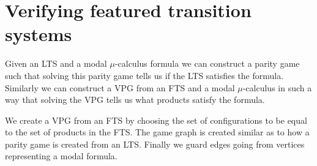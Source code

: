 \section{Verifying featured transition systems}
Given an LTS and a modal $\mu$-calculus formula we can construct a parity game such that solving this parity game tells us if the LTS satisfies the formula. Similarly we can construct a VPG from an FTS and a modal $\mu$-calculus in such a way that solving the VPG tells us what products satisfy the formula.

We create a VPG from an FTS by choosing the set of configurations to be equal to the set of products in the FTS. The game graph is created similar as to how a parity game is created from an LTS. Finally we guard edges going from vertices representing a modal formula.

